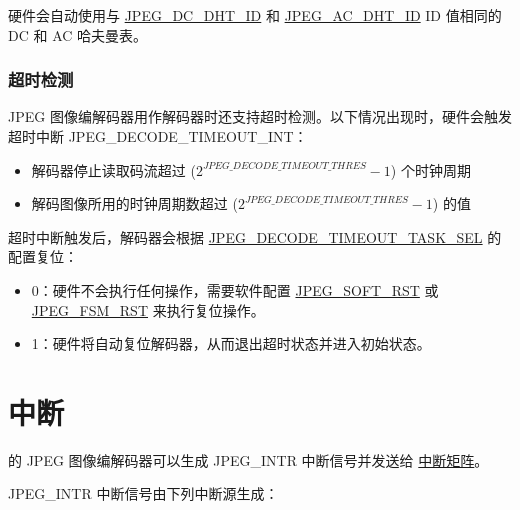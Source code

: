 \documentclass[main\_\_CN.tex]{subfiles}
\begin{document}
硬件会自动使用与 \hyperref[regdesc:JPEGDHTINFOREG]{JPEG\_DC\_DHT\_ID} 和 \hyperref[regdesc:JPEGDHTINFOREG]{JPEG\_AC\_DHT\_ID} ID 值相同的 DC 和 AC 哈夫曼表。

\subsubsection{超时检测}

JPEG 图像编解码器用作解码器时还支持超时检测。以下情况出现时，硬件会触发超时中断 JPEG\_DECODE\_TIMEOUT\_INT：
\begin{itemize}
    \item 解码器停止读取码流超过 ($ 2 ^ {\hyperref[fielddesc:JPEGDECODETIMEOUTTHRES]{JPEG\_DECODE\_TIMEOUT\_THRES}} - 1 $) 个时钟周期
    \item 解码图像所用的时钟周期数超过 ($ 2 ^ {\hyperref[fielddesc:JPEGDECODETIMEOUTTHRES]{JPEG\_DECODE\_TIMEOUT\_THRES}} - 1 $) 的值
\end{itemize}

超时中断触发后，解码器会根据 \hyperref[fielddesc:JPEGDECODETIMEOUTTASKSEL]{JPEG\_DECODE\_TIMEOUT\_TASK\_SEL} 的配置复位：
\begin{itemize}
    \item 0：硬件不会执行任何操作，需要软件配置 \hyperref[fielddesc:JPEGSOFTRST]{JPEG\_SOFT\_RST} 或 \hyperref[fielddesc:JPEGFSMRST]{JPEG\_FSM\_RST} 来执行复位操作。
    \item 1：硬件将自动复位解码器，从而退出超时状态并进入初始状态。
\end{itemize}



\section{中断}

\chipname{} 的 JPEG 图像编解码器可以生成 JPEG\_INTR 中断信号并发送给 \hyperref[mod:intmtrx]{中断矩阵}。

JPEG\_INTR 中断信号由下列中断源生成：
\end{document}
